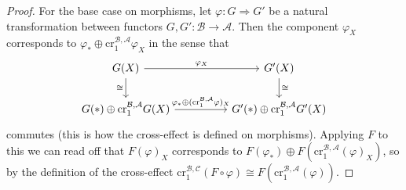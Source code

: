 \begin{proof}
    For the base case on morphisms, let $\varphi: G \Rightarrow G'$ be a natural transformation
    between functors $G,G': \mathcal B \to \mathcal A$. Then the component $\varphi_X$ corresponds to $\varphi_* \oplus \text{cr}_1^{\mathcal B, \mathcal A}\varphi_X$ in the sense that 
\[\begin{tikzcd}
	{G(X)} && {G'(X)} \\
	{G(*) \oplus \text{cr}_1^{\mathcal B, \mathcal A}G(X)} && {G'(*) \oplus \text{cr}_1^{\mathcal B, \mathcal A}G'(X)}
	\arrow["{\varphi_X}", from=1-1, to=1-3]
	\arrow["{\varphi_* \oplus (\text{cr}_1^{\mathcal B, \mathcal A}\varphi)_X}", from=2-1, to=2-3]
	\arrow["\cong"', from=1-1, to=2-1]
	\arrow["\cong", from=1-3, to=2-3]
\end{tikzcd}\]
    commutes (this is how the cross-effect is defined on morphisms). Applying $F$ to this we can read off that $F(\varphi)_X$ corresponds to $F(\varphi_*) \oplus F(\text{cr}_1^{\mathcal B, \mathcal A}(\varphi)_X)$, so by the definition of the cross-effect $\text{cr}_1^{\mathcal B, \mathcal C}(F \circ \varphi) \cong F(\text{cr}_1^{\mathcal B, \mathcal A}(\varphi))$.
    

\end{proof}
